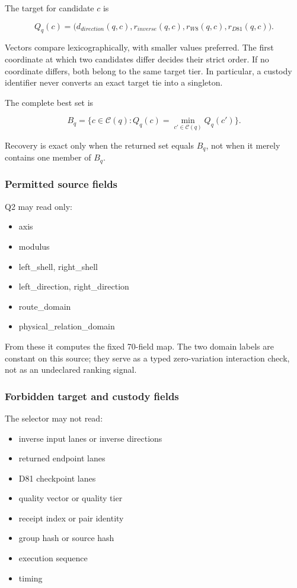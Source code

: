The target for candidate \(c\) is

\[
Q_q(c)=
\bigl(
d_{direction}(q,c),
r_{inverse}(q,c),
r_{W8}(q,c),
r_{D81}(q,c)
\bigr).
\]

Vectors compare lexicographically, with smaller values preferred. The
first coordinate at which two candidates differ decides their strict
order. If no coordinate differs, both belong to the same target tier. In
particular, a custody identifier never converts an exact target tie into
a singleton.

The complete best set is

\[
B_q=\{c\in\mathcal C(q):Q_q(c)=\min_{c'\in\mathcal C(q)}Q_q(c')\}.
\]

Recovery is exact only when the returned set equals \(B_q\), not when it
merely contains one member of \(B_q\).

\subsubsection{Permitted source fields}\label{viii-ch07-permitted-source-fields}

Q2 may read only:

\begin{itemize}
\tightlist
\item
  axis
\item
  modulus
\item
  left\_shell, right\_shell
\item
  left\_direction, right\_direction
\item
  route\_domain
\item
  physical\_relation\_domain
\end{itemize}

From these it computes the fixed 70-field map. The two domain labels are
constant on this source; they serve as a typed zero-variation
interaction check, not as an undeclared ranking signal.

\subsubsection{Forbidden target and custody
fields}\label{viii-ch07-forbidden-target-and-custody-fields}

The selector may not read:

\begin{itemize}
\tightlist
\item
  inverse input lanes or inverse directions
\item
  returned endpoint lanes
\item
  D81 checkpoint lanes
\item
  quality vector or quality tier
\item
  receipt index or pair identity
\item
  group hash or source hash
\item
  execution sequence
\item
  timing
\end{itemize}

